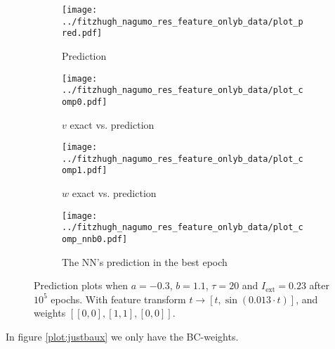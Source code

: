 \documentclass[a4paper]{article}
\begin{document}
\begin{figure}[H]
	\centering 
	\begin{subfigure}[b]{0.47\textwidth}
		\centering
		\texttt{[image: ../fitzhugh\_nagumo\_res\_feature\_onlyb\_data/plot\_pred.pdf]}
		\caption{Prediction}
		\label{fig:justbdataa}
	\end{subfigure}
	\begin{subfigure}[b]{0.47\textwidth}
		\centering
		\texttt{[image: ../fitzhugh\_nagumo\_res\_feature\_onlyb\_data/plot\_comp0.pdf]}
		\caption{$v$ exact vs. prediction}
		\label{fig:justbdatab}
	\end{subfigure}
	\begin{subfigure}[b]{0.47\textwidth}
		\centering
		\texttt{[image: ../fitzhugh\_nagumo\_res\_feature\_onlyb\_data/plot\_comp1.pdf]}
		\caption{$w$ exact vs. prediction}
		\label{fig:justbdatac}
	\end{subfigure}
	\begin{subfigure}[b]{0.47\textwidth}
		\centering
		\texttt{[image: ../fitzhugh\_nagumo\_res\_feature\_onlyb\_data/plot\_comp\_nnb0.pdf]}
		\caption{The NN's prediction in the best epoch}
		\label{fig:justbdatad}
	\end{subfigure}
	\caption{Prediction plots when $a=-0.3$, $b=1.1$, $\tau=20$ and $ I_{\text{ext}}=0.23$ after $10^5$ epochs. With feature transform $t \rightarrow \left[ t, \sin(0.013\cdot t) \right] $, and weights $\left[ \left[ 0, 0\right],\left[ 1, 1\right],  \left[ 0, 0\right] \right]$.}
	\label{plot:justbdata}
\end{figure} 	


In figure \ref{plot:justbaux} we only have the BC-weights. 
\end{document}
